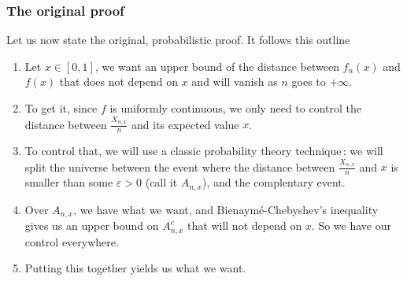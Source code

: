 \documentclass[a4paper, 11pt]{article}
\begin{document}
\subsubsection{The original proof}
Let us now state the original, probabilistic proof. It follows this outline
\begin{enumerate}
	\item Let $x∈[0, 1]$, we want an upper bound of the distance between $f_n(x)$ and $f(x)$ that does not depend on $x$ and will vanish as $n$ goes to $+∞$.
	\item To get it, since $f$ is uniformly continuous, we only need to control the distance between $\frac{X_{n,x}}{n}$ and its expected value $x$.
	\item To control that, we will use a classic probability theory technique : we will split the universe between the event where the distance between $\frac{X_{n,x}}{n}$ and $x$ is smaller than some $ε>0$ (call it $A_{n, x}$), and the complentary event.
	\item Over $A_{n, x}$, we have what we want, and Bienaymé-Chebyshev's inequality gives us an upper bound on $A_{n, x}^c$ that will not depend on $x$. So we have our control everywhere.
	\item Putting this together yields us what we want.
\end{enumerate}
\end{document}
